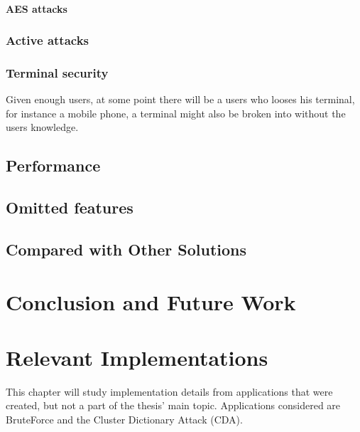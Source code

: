 \documentclass[pdftex,english,10pt,b5paper,twoside]{book}
\begin{document}
\subsubsection{AES attacks}

\subsection{Active attacks}


\subsection{Terminal security}
Given enough users, at some point there will be a users who looses his
terminal, for instance a mobile phone, a terminal might also be broken into
without the users knowledge.

\section{Performance}

\section{Omitted features}

\section{Compared with Other Solutions}
\chapter{Conclusion and Future Work}




\appendix
\appendixpage
\addappheadtotoc
\chapter{Relevant Implementations}
\label{ap:RI}
This chapter will study implementation details from applications that were
created, but not a part of the thesis' main topic. Applications considered are 
BruteForce and the Cluster Dictionary Attack (CDA).
\end{document}
